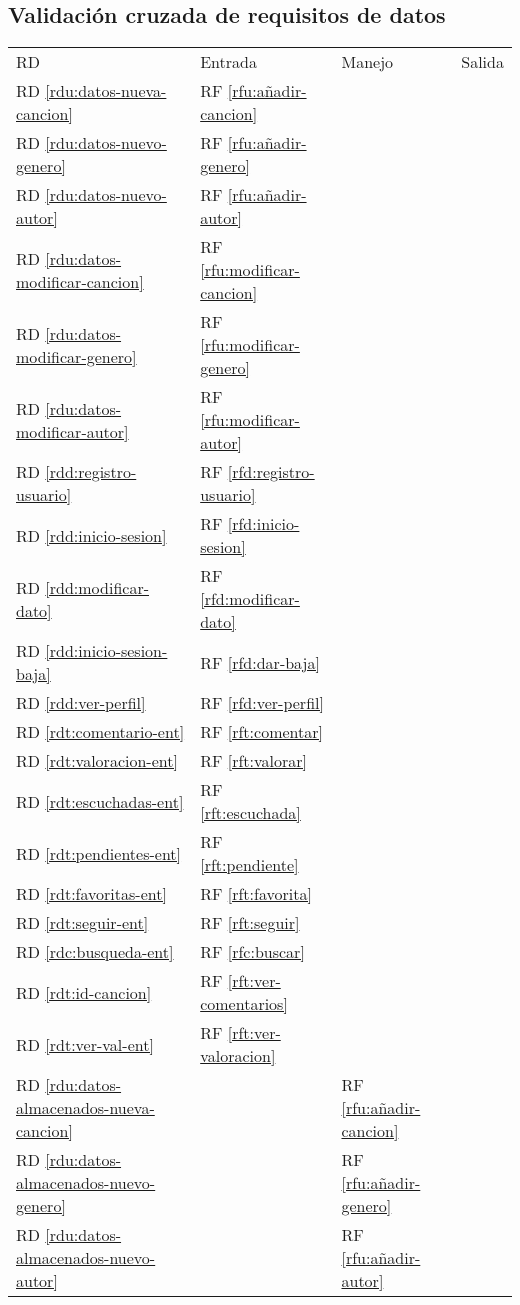 \documentclass[
  12pt,
  a4paper,
  DIV=12,
  spanish,
]{scrartcl}
\newcounter{RF}
\newcounter{RD}
\begin{document}
\subsection{Validación cruzada de requisitos de datos}
\keepXColumns
\begin{tabularx}{\linewidth}{l|XXX}
  RD & Entrada & Manejo & Salida \\
  RD \ref{rdu:datos-nueva-cancion} & RF \ref{rfu:añadir-cancion} & & \\
  RD \ref{rdu:datos-nuevo-genero} & RF \ref{rfu:añadir-genero} & & \\
  RD \ref{rdu:datos-nuevo-autor} & RF \ref{rfu:añadir-autor} \\
  RD \ref{rdu:datos-modificar-cancion} & RF \ref{rfu:modificar-cancion} & & \\
  RD \ref{rdu:datos-modificar-genero} & RF \ref{rfu:modificar-genero} & & \\
  RD \ref{rdu:datos-modificar-autor} & RF \ref{rfu:modificar-autor} \\
  RD \ref{rdd:registro-usuario} & RF \ref{rfd:registro-usuario} & & \\
  RD \ref{rdd:inicio-sesion} & RF \ref{rfd:inicio-sesion} & & \\
  RD \ref{rdd:modificar-dato} & RF \ref{rfd:modificar-dato} & & \\
  RD \ref{rdd:inicio-sesion-baja} & RF \ref{rfd:dar-baja} & & \\
  RD \ref{rdd:ver-perfil} & RF \ref{rfd:ver-perfil} & & \\
  RD \ref{rdt:comentario-ent} & RF \ref{rft:comentar} & & \\
  RD \ref{rdt:valoracion-ent} & RF \ref{rft:valorar} & & \\
  RD \ref{rdt:escuchadas-ent} & RF \ref{rft:escuchada} & & \\
  RD \ref{rdt:pendientes-ent} & RF \ref{rft:pendiente} & & \\
  RD \ref{rdt:favoritas-ent} & RF \ref{rft:favorita} & & \\
  RD \ref{rdt:seguir-ent} & RF \ref{rft:seguir} & & \\
  RD \ref{rdc:busqueda-ent} & RF \ref{rfc:buscar} & & \\
  RD \ref{rdt:id-cancion}  & RF \ref{rft:ver-comentarios} & & \\
  RD \ref{rdt:ver-val-ent} & RF \ref{rft:ver-valoracion} & & \\
  RD \ref{rdu:datos-almacenados-nueva-cancion} & & RF \ref{rfu:añadir-cancion} & \\
  RD \ref{rdu:datos-almacenados-nuevo-genero} & & RF \ref{rfu:añadir-genero} & \\
  RD \ref{rdu:datos-almacenados-nuevo-autor} & & RF \ref{rfu:añadir-autor} & \\


\end{tabularx}
\end{document}
